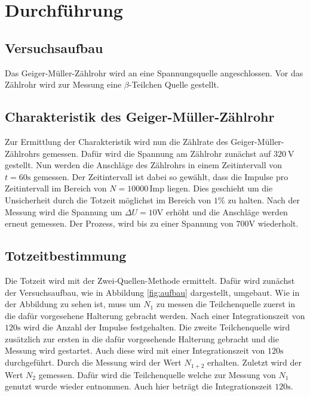 \section{Durchführung}
\label{sec:Durchführung}
\subsection{Versuchsaufbau}
Das Geiger-Müller-Zählrohr wird an eine Spannungsquelle angeschlossen.
Vor das Zählrohr wird zur Messung eine $\beta$-Teilchen Quelle gestellt.

\subsection{Charakteristik des Geiger-Müller-Zählrohr}
\label{subsec:charak}
Zur Ermittlung der Charakteristik wird nun die Zählrate des Geiger-Müller-Zählrohrs gemessen.
Dafür wird die Spannung am Zählrohr zunächst auf $\SI{320}{\V}$ gestellt.
Nun werden die Anschläge des Zählrohrs in einem Zeitintervall von $t=60\si{\second}$ gemessen.
Der Zeitintervall ist dabei so gewählt, dass die Impulse pro Zeitintervall im Bereich von $N=10000 \, \text{Imp}$ liegen.
Dies geschieht um die Unsicherheit durch die Totzeit möglichst im Bereich von $1\%$ zu halten.
Nach der Messung wird die Spannung um $\Delta U = 10\si{\V}$ erhöht und die Anschläge werden erneut gemessen.
Der Prozess, wird bis zu einer Spannung von $700\si{\V}$ wiederholt.
\FloatBarrier
\subsection{Totzeitbestimmung}
\label{subsec:tot}
Die Totzeit wird mit der Zwei-Quellen-Methode ermittelt.
Dafür wird zunächst der Versuchsaufbau, wie in Abbildung \ref{fig:aufbau} dargestellt, umgebaut.
Wie in der Abbildung zu sehen ist, muss um $N_1$ zu messen die Teilchenquelle zuerst in die dafür vorgesehene Halterung gebracht werden.
Nach einer Integrationszeit von $120\si{\second}$ wird die Anzahl der Impulse festgehalten.
Die zweite Teilchenquelle wird zusätzlich zur ersten in die dafür vorgesehende Halterung gebracht und die Messung wird gestartet.
Auch diese wird mit einer Integrationszeit von $120 \si{\second}$ durchgeführt.
Durch die Messung wird der Wert $N_{1+2}$ erhalten.
Zuletzt wird der Wert $N_2$ gemessen.
Dafür wird die Teilchenquelle welche zur Messung von $N_1$ genutzt wurde wieder entnommen.
Auch hier beträgt die Integrationszeit $120\si{\second}$.

